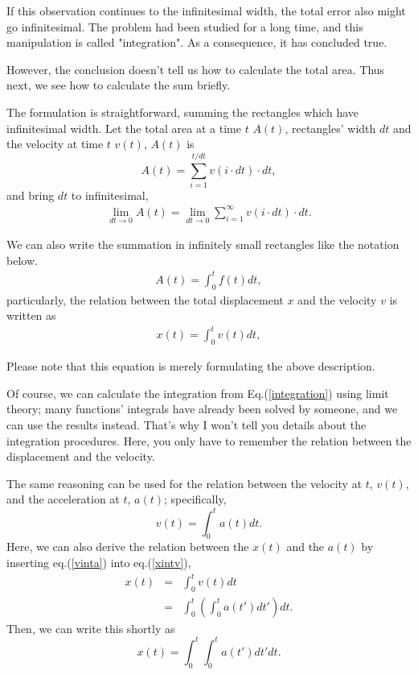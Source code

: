 \documentclass[pdflatex,sn-mathphys-num]{sn-jnl}%
\theoremstyle{thmstyleone}%
\theoremstyle{thmstyletwo}%
\theoremstyle{thmstylethree}%
\begin{document}
If this observation continues to the infinitesimal width, the total error also might go infinitesimal. The problem had been studied for a long time, and this manipulation is called "integration". As a consequence, it has concluded true.

However, the conclusion doesn't tell us how to calculate the total area. Thus next, we see how to calculate the sum briefly. 

The formulation is straightforward, summing the rectangles which have infinitesimal width.
Let the total area at a time $t$ $A(t)$, rectangles' width $dt$ and the velocity at time $t$ $v(t)$, $A(t)$ is
\begin{equation}
	A(t) = \sum_{i = 1}^{t/dt} v(i \cdot dt) \cdot dt ,
\end{equation}
and bring $dt$ to infinitesimal,
\begin{eqnarray}
	\label{integration}
	\lim_{dt \rightarrow 0} A(t) =\lim_{dt \rightarrow 0} \sum_{i=1}^{\infty}v(i \cdot dt) \cdot dt .
\end{eqnarray}

We can also write the summation in infinitely small rectangles like the notation below.
\begin{eqnarray}
	A(t) = \int_{0}^{t} f(t) dt ,
\end{eqnarray}
particularly, the relation between the total displacement $x$ and the velocity $v$ is written as
\begin{eqnarray}\label{xintv}
	x(t) = \int_{0}^{t} v(t) dt ,
\end{eqnarray}

Please note that this equation is merely formulating the above description.

Of course, we can calculate the integration from Eq.(\ref{integration}) using limit theory; many functions' integrals have already been solved by someone, and we can use the results instead. That's why I won't tell you details about the integration procedures. Here, you only have to remember the relation between the displacement and the velocity.

The same reasoning can be used for the relation between the velocity at $t$, $v(t)$, and the acceleration at $t$, $a(t)$; specifically,
\begin{equation}\label{vinta}
	v(t) = \int_{0}^{t} a(t) dt .
\end{equation}
Here, we can also derive the relation between the $x(t)$ and the $a(t)$ by inserting eq.(\ref{vinta}) into eq.(\ref{xintv}),
\begin{eqnarray}
	x(t) &=& \int_{0}^{t} v(t) dt\nonumber\\
		&=& \int_{0}^{t}(\int_{0}^{t}a(t')dt')dt .
\end{eqnarray}
Then, we can write this shortly as
\begin{equation}
		x(t) = \int_{0}^{t}\int_{0}^{t}a(t')dt'dt .
\end{equation}
\end{document}

